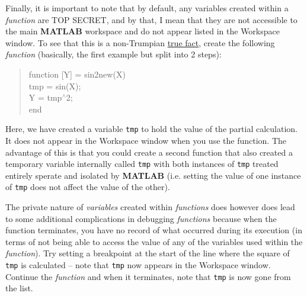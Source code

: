 \documentclass{tufte-book} %
\newenvironment{docspec}{\begin{quotation}\ttfamily\parskip0pt\parindent0pt\ignorespaces}{\end{quotation}}
\begin{document}

Finally, it is important to note that by default, any variables created within a \textit{function} are TOP SECRET, and by that, I mean that they are not accessible to the main \textbf{MATLAB} workspace and do not appear listed in the \textsf{Workspace window}. To see that this is a non-Trumpian \uline{true fact}, create the following \textit{function} (basically, the first example but split into 2 steps):
\begin{docspec}
function [Y] = sin2new(X)
\\tmp = sin(X);
\\Y = tmp\(^{\wedge}\)2; 
\\end
\end{docspec}
\noindent Here, we have created a variable \texttt{tmp} to hold the value of the partial calculation. It does not appear in the \textsf{Workspace window} when you use the function. The advantage of this is that you could create a second function that also created a temporary variable internally called \texttt{tmp} with both instances of \texttt{tmp} treated entirely sperate and isolated by \textbf{MATLAB} (i.e. setting the value of one instance of \texttt{tmp} does not affect the value of the other).

The private nature of \textit{variables} created within \textit{functions} does however does lead to some additional complications in debugging \textit{functions} because when the function terminates, you have no record of what occurred during its execution (in terms of not being able to access the value of any of the variables used within the \textit{function}). Try setting a breakpoint at the start of the line where the square of \texttt{tmp} is calculated -- note that \texttt{tmp} now appears in the \textsf{Workspace window}. Continue the \textit{function} and when it terminates, note that \texttt{tmp} is now gone from the list.
\end{document}
